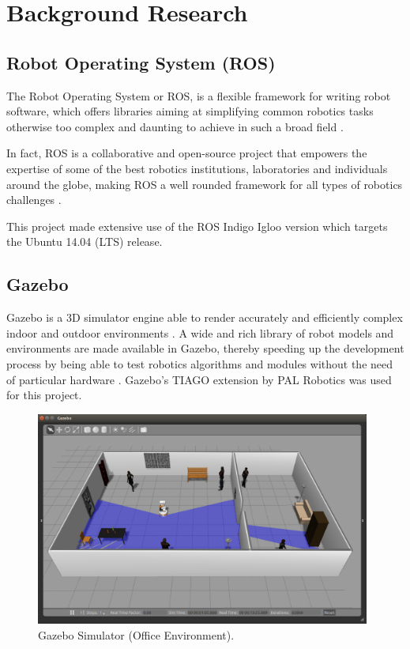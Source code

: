 \chapter{Background Research}
\label{chapter2}

\section{Robot Operating System (ROS)}

The Robot Operating System or ROS, is a flexible framework for writing robot software, which offers libraries aiming at simplifying common robotics tasks otherwise too complex and daunting to achieve in such a broad field \cite{website:aboutROS}. 

In fact, ROS is a collaborative and open-source project that empowers the expertise of some of the best robotics institutions, laboratories and individuals around the globe, making ROS a well rounded framework for all types of robotics challenges \cite{website:aboutROS}. 

This project made extensive use of the ROS Indigo Igloo version which targets the Ubuntu 14.04 (LTS) release.

\section{Gazebo}

Gazebo is a 3D simulator engine able to render accurately and efficiently complex indoor and outdoor environments \cite{website:Gazebo}. A wide and rich library of robot models and environments are made available in Gazebo, thereby speeding up the development process by being able to test robotics algorithms and modules without the need of particular hardware \cite{website:Gazebo}. Gazebo's TIAGO extension by PAL Robotics was used for this project.

\begin{figure}[H]
\begin{center}
\includegraphics[width=11cm]{images/chapter2_gazebo_screenshot.png}
\end{center}
\caption{Gazebo Simulator (Office Environment).}
\label{fig:gazebo_screenshot}
\end{figure}

